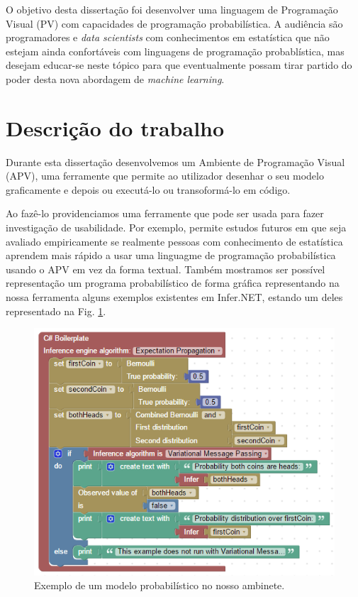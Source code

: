 \documentclass[9pt,a4paper]{extarticle}
\begin{document}
\begin{multicols}{2}
O objetivo desta dissertação foi desenvolver uma linguagem de Programação Visual (PV)
com capacidades de programação probabilística. A audiência são programadores e
\textit{data scientists} com conhecimentos em estatística que não estejam ainda
confortáveis com linguagens de programação probablística, mas desejam educar-se
neste tópico para que eventualmente possam tirar partido do poder desta nova abordagem
de \textit{machine learning}.

\section{Descrição do trabalho}

Durante esta dissertação desenvolvemos um Ambiente de Programação Visual (APV),
uma ferramente que permite ao utilizador desenhar o seu modelo graficamente e
depois ou executá-lo ou transoformá-lo em código.

Ao fazê-lo providenciamos uma ferramente que pode ser usada para fazer investigação
de usabilidade. Por exemplo, permite estudos futuros em que seja avaliado empiricamente
se realmente pessoas com conhecimento de estatística aprendem mais rápido a usar
uma linguagme de programação probabilística usando o APV em vez da forma textual.
Também mostramos ser possível representação um programa probabilístico de forma gráfica
representando na nossa ferramenta alguns exemplos existentes em Infer.NET,
estando um deles representado na Fig. \ref{fig:first}.

\begin{figure}[H]
\centerline{\includegraphics[scale=.6]{firstExample.png}}
\caption{Exemplo de um modelo probabilístico no nosso ambinete.}
\label{fig:first}
\end{figure}


\end{multicols}
\end{document}
